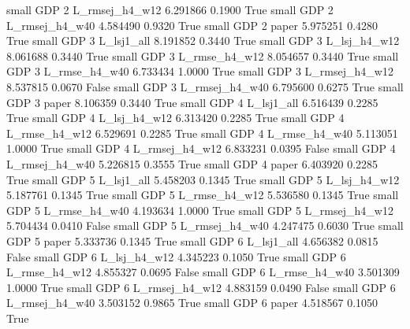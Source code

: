      small      GDP                 2 L_rmsej_h4_w12   6.291866      0.1900    True
     small      GDP                 2 L_rmsej_h4_w40   4.584490      0.9320    True
     small      GDP                 2          paper   5.975251      0.4280    True
     small      GDP                 3     L_lsj1_all   8.191852      0.3440    True
     small      GDP                 3   L_lsj_h4_w12   8.061688      0.3440    True
     small      GDP                 3  L_rmse_h4_w12   8.054657      0.3440    True
     small      GDP                 3  L_rmse_h4_w40   6.733434      1.0000    True
     small      GDP                 3 L_rmsej_h4_w12   8.537815      0.0670   False
     small      GDP                 3 L_rmsej_h4_w40   6.795600      0.6275    True
     small      GDP                 3          paper   8.106359      0.3440    True
     small      GDP                 4     L_lsj1_all   6.516439      0.2285    True
     small      GDP                 4   L_lsj_h4_w12   6.313420      0.2285    True
     small      GDP                 4  L_rmse_h4_w12   6.529691      0.2285    True
     small      GDP                 4  L_rmse_h4_w40   5.113051      1.0000    True
     small      GDP                 4 L_rmsej_h4_w12   6.833231      0.0395   False
     small      GDP                 4 L_rmsej_h4_w40   5.226815      0.3555    True
     small      GDP                 4          paper   6.403920      0.2285    True
     small      GDP                 5     L_lsj1_all   5.458203      0.1345    True
     small      GDP                 5   L_lsj_h4_w12   5.187761      0.1345    True
     small      GDP                 5  L_rmse_h4_w12   5.536580      0.1345    True
     small      GDP                 5  L_rmse_h4_w40   4.193634      1.0000    True
     small      GDP                 5 L_rmsej_h4_w12   5.704434      0.0410   False
     small      GDP                 5 L_rmsej_h4_w40   4.247475      0.6030    True
     small      GDP                 5          paper   5.333736      0.1345    True
     small      GDP                 6     L_lsj1_all   4.656382      0.0815   False
     small      GDP                 6   L_lsj_h4_w12   4.345223      0.1050    True
     small      GDP                 6  L_rmse_h4_w12   4.855327      0.0695   False
     small      GDP                 6  L_rmse_h4_w40   3.501309      1.0000    True
     small      GDP                 6 L_rmsej_h4_w12   4.883159      0.0490   False
     small      GDP                 6 L_rmsej_h4_w40   3.503152      0.9865    True
     small      GDP                 6          paper   4.518567      0.1050    True

